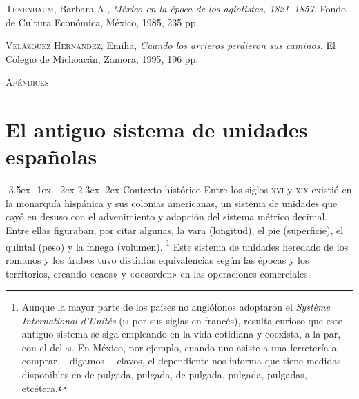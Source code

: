 \documentclass[14pt,twoside,final]{extbook} %
\makeatletter
\let\oldfootnote\footnote
\renewcommand\footnote[1]{%
\oldfootnote{\hspace{1mm}#1}}
\renewcommand\section{\@startsection {section}{1}{\z@}%
                                     {-3.5ex \@plus -1ex \@minus -.2ex}%
                                     {2.3ex \@plus .2ex}%
                                     {\normalfont\large\bfseries\sc}}
\providecommand\phantomsection{} %
\makeatother
\begin{document}
\textsc{Tenenbaum}, Barbara A., \emph{México en la época de los agiotistas, 1821--1857.} Fondo de Cultura Económica, México, 1985, 235 pp.

\textsc{Velázquez Hernández}, Emilia, \emph{Cuando los arrieros perdieron sus caminos.} El Colegio de Michoacán, Zamora, 1995, 196 pp.
\cleardoublepage
\newpage
\pagestyle{empty}
\hspace*{0pt}
\protect\phantomsection
\vfill
\begin{center}
\Huge\scshape Apéndices
\end{center}
\vfill
\appendix
\chapter{El antiguo sistema de unidades españolas}
\label{ap:antiguo-sistema-unidades-españolas}
\thispagestyle{empty}
\pagestyle{fancy}
\fancyhf{} %
\fancyhead[RO,LE]{\thepage}
\renewcommand{\headrulewidth}{0pt}
\section{Contexto histórico}
Entre los siglos \textsc{xvi} y \textsc{xix} existió en la monarquía hispánica y sus colonias americanas, un sistema de unidades que cayó en desuso con el advenimiento y adopción del sistema métrico decimal. Entre ellas figuraban, por citar algunas, la vara (longitud), el pie (superficie), el quintal (peso) y la fanega (volumen).\footnote{Aunque la mayor parte de los países no anglófonos adoptaron el \emph{Système International d'\/Unités} (\textsc{si} por sus siglas en francés), resulta curioso que este antiguo sistema se siga empleando en la vida cotidiana y coexista, a la par, con el del \textsc{si}. En México, por ejemplo, cuando uno asiste a una ferretería a comprar ---digamos--- clavos, el dependiente nos informa que tiene medidas disponibles en \textfrac{1}{4} de pulgada, \textfrac{1}{2} pulgada, \textfrac{3}{4} de pulgada, \textlf{1} pulgada, \textfrac[2]{1}{2} pulgadas, etcétera.} Este sistema de unidades heredado de los romanos y los árabes tuvo distintas equivalencias según las épocas y los territorios, creando «caos» y «desorden» en las operaciones comerciales.
\end{document}
